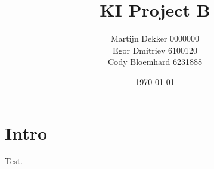 \documentclass[a4paper]{article}
\title{KI Project B}
\author{
Martijn Dekker  0000000 \\
Egor Dmitriev   6100120 \\
Cody Bloemhard  6231888 \\
}
\date{\today}
\begin{document}
\maketitle

\section{Intro}
\label{sec:intro}
Test.
\end{document}
